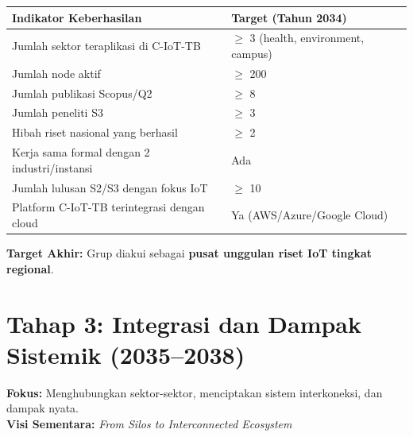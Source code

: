 \documentclass[11pt,a4paper]{article}
\begin{document}
\begin{center}
    \begin{tabular}{ll}
        \toprule
        \textbf{Indikator Keberhasilan}              & \textbf{Target (Tahun 2034)}           \\
        \midrule
        Jumlah sektor teraplikasi di C-IoT-TB        & $\geq$ 3 (health, environment, campus) \\
        Jumlah node aktif                            & $\geq$ 200                             \\
        Jumlah publikasi Scopus/Q2                   & $\geq$ 8                               \\
        Jumlah peneliti S3                           & $\geq$ 3                               \\
        Hibah riset nasional yang berhasil           & $\geq$ 2                               \\
        Kerja sama formal dengan 2 industri/instansi & Ada                                    \\
        Jumlah lulusan S2/S3 dengan fokus IoT        & $\geq$ 10                              \\
        Platform C-IoT-TB terintegrasi dengan cloud  & Ya (AWS/Azure/Google Cloud)            \\
        \bottomrule
    \end{tabular}
\end{center}

\textbf{Target Akhir:} Grup diakui sebagai \textbf{pusat unggulan riset IoT tingkat regional}.

\section{Tahap 3: Integrasi dan Dampak Sistemik (2035–2038)}
\label{sec:tahap3}

\textbf{Fokus:} Menghubungkan sektor-sektor, menciptakan sistem interkoneksi, dan dampak nyata.\\
\textbf{Visi Sementara:} \textit{From Silos to Interconnected Ecosystem}
\end{document}
